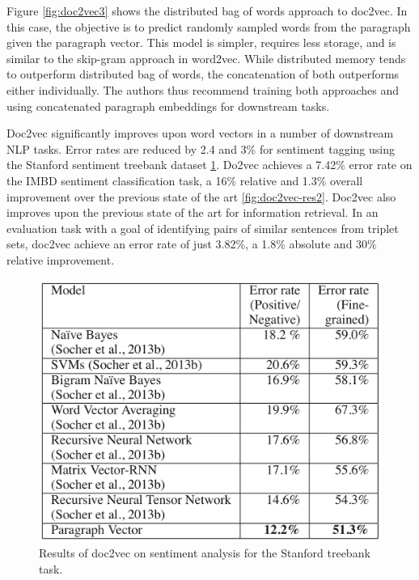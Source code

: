 Figure \ref{fig:doc2vec3} shows the distributed bag of words approach to doc2vec. In this case, the objective is to predict randomly sampled words from the paragraph given the paragraph vector. This model is simpler, requires less storage, and is similar to the skip-gram approach in word2vec. While distributed memory tends to outperform distributed bag of words, the concatenation of both outperforms either individually. The authors thus recommend training both approaches and using concatenated paragraph embeddings for downstream tasks.

Doc2vec significantly improves upon word vectors in a number of downstream NLP tasks. Error rates are reduced by 2.4 and 3\% for sentiment tagging using the Stanford sentiment treebank dataset \ref{fig:doc2vec-res1}. Do2vec achieves a 7.42\% error rate on the IMBD sentiment classification task, a 16\% relative and 1.3\% overall improvement over the previous state of the art \ref{fig:doc2vec-res2}. Doc2vec also improves upon the previous state of the art for information retrieval. In an evaluation task with a goal of identifying pairs of similar sentences from triplet sets, doc2vec achieve an error rate of just 3.82\%, a 1.8\% absolute and 30\% relative improvement. 

\newpage


\begin{figure}
\centering
  \includegraphics[width=.7\linewidth]{files/doc2vec-4.png}
  \caption{Results of doc2vec on sentiment analysis for the Stanford treebank task.}
  \label{fig:doc2vec-res1}
\end{figure}

